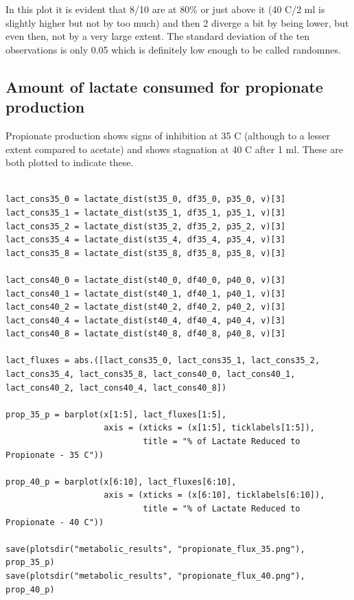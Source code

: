 \documentclass[11pt]{article}
\begin{document}
In this plot it is evident that 8/10 are at 80\% or just above it (40 C/2 ml is slightly higher but not by too much) and then 2 diverge a bit by being lower, but even then, not by a very large extent. The standard deviation of the ten observations is only 0.05 which is definitely low enough to be called randomnes.

\subsection{Amount of lactate consumed for propionate production}
\label{sec:orgb1bb36b}
Propionate production shows signs of inhibition at 35 C (although to a lesser extent compared to acetate) and shows stagnation at 40 C after 1 ml. These are both plotted to indicate these.

\begin{verbatim}

lact_cons35_0 = lactate_dist(st35_0, df35_0, p35_0, v)[3]
lact_cons35_1 = lactate_dist(st35_1, df35_1, p35_1, v)[3]
lact_cons35_2 = lactate_dist(st35_2, df35_2, p35_2, v)[3]
lact_cons35_4 = lactate_dist(st35_4, df35_4, p35_4, v)[3]
lact_cons35_8 = lactate_dist(st35_8, df35_8, p35_8, v)[3]

lact_cons40_0 = lactate_dist(st40_0, df40_0, p40_0, v)[3]
lact_cons40_1 = lactate_dist(st40_1, df40_1, p40_1, v)[3]
lact_cons40_2 = lactate_dist(st40_2, df40_2, p40_2, v)[3]
lact_cons40_4 = lactate_dist(st40_4, df40_4, p40_4, v)[3]
lact_cons40_8 = lactate_dist(st40_8, df40_8, p40_8, v)[3]

lact_fluxes = abs.([lact_cons35_0, lact_cons35_1, lact_cons35_2, lact_cons35_4, lact_cons35_8, lact_cons40_0, lact_cons40_1, lact_cons40_2, lact_cons40_4, lact_cons40_8])

prop_35_p = barplot(x[1:5], lact_fluxes[1:5],
                    axis = (xticks = (x[1:5], ticklabels[1:5]),
                            title = "% of Lactate Reduced to Propionate - 35 C"))

prop_40_p = barplot(x[6:10], lact_fluxes[6:10],
                    axis = (xticks = (x[6:10], ticklabels[6:10]),
                            title = "% of Lactate Reduced to Propionate - 40 C"))

save(plotsdir("metabolic_results", "propionate_flux_35.png"), prop_35_p)
save(plotsdir("metabolic_results", "propionate_flux_40.png"), prop_40_p)
\end{verbatim}
\end{document}
